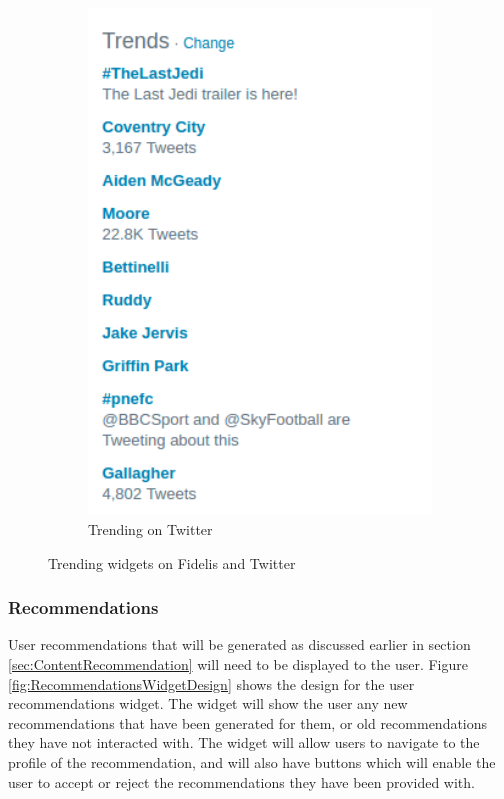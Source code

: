 \begin{figure}[H]
\begin{subfigure}[b]{0.4\linewidth}
        \includegraphics[width=1\textwidth]{Images/Design/trending-twitter}
        \caption{Trending on Twitter}
        \label{fig:trending-twitter}
    \end{subfigure}
    \caption{Trending widgets on Fidelis and Twitter}
    \label{fig:TrendingWidgets}
\end{figure}

\subsubsection{Recommendations}
User recommendations that will be generated as discussed earlier in section \ref{sec:ContentRecommendation} will need to be displayed to the user. Figure \ref{fig:RecommendationsWidgetDesign} shows the design for the user recommendations widget. The widget will show the user any new recommendations that have been generated for them, or old recommendations they have not interacted with. The widget will allow users to navigate to the profile of the recommendation, and will also have buttons which will enable the user to accept or reject the recommendations they have been provided with.

